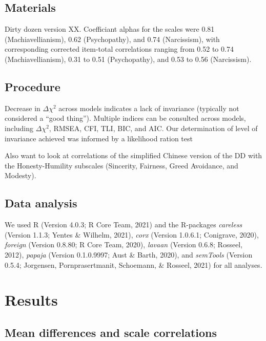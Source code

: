 \documentclass[
  english,
  man]{apa6}
\begin{document}
\hypertarget{materials}{%
\subsection{Materials}\label{materials}}

Dirty dozen version XX. Coefficiant alphas for the scales were 0.81 (Machiavellianism), 0.62 (Psychopathy), and 0.74 (Narcissism), with corresponding corrected item-total correlations ranging from 0.52 to 0.74 (Machiavellianism), 0.31 to 0.51 (Psychopathy), and 0.53 to 0.56 (Narcissism).

\hypertarget{procedure}{%
\subsection{Procedure}\label{procedure}}

Decrease in \(\Delta\chi^2\) across models indicates a lack of invariance (typically not considered a \enquote{good thing}). Multiple indices can be consulted across models, including \(\Delta\chi^2\), RMSEA, CFI, TLI, BIC, and AIC. Our determination of level of invariance achieved was informed by a likelihood ration test

Also want to look at correlations of the simplified Chinese version of the DD with the Honesty-Humility subscales (Sincerity, Fairness, Greed Avoidance, and Modesty).

\hypertarget{data-analysis}{%
\subsection{Data analysis}\label{data-analysis}}

We used R (Version 4.0.3; R Core Team, 2021) and the R-packages \emph{careless} (Version 1.1.3; Yentes \& Wilhelm, 2021), \emph{corx} (Version 1.0.6.1; Conigrave, 2020), \emph{foreign} (Version 0.8.80; R Core Team, 2020), \emph{lavaan} (Version 0.6.8; Rosseel, 2012), \emph{papaja} (Version 0.1.0.9997; Aust \& Barth, 2020), and \emph{semTools} (Version 0.5.4; Jorgensen, Pornprasertmanit, Schoemann, \& Rosseel, 2021) for all analyses.

\hypertarget{results}{%
\section{Results}\label{results}}

\hypertarget{mean-differences-and-scale-correlations}{%
\subsection{Mean differences and scale correlations}\label{mean-differences-and-scale-correlations}}
\end{document}
